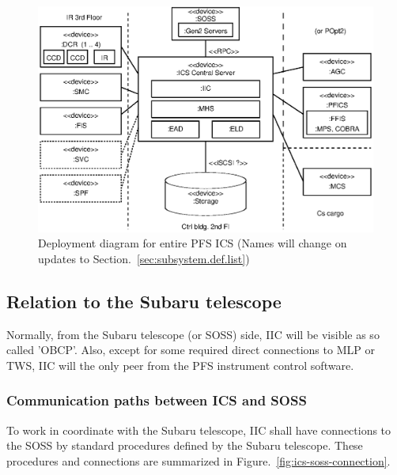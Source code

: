 \documentclass[a4paper,notitlepage]{article}
\begin{document}
\begin{figure}[htb]
  \begin{center}
    \includegraphics[scale=0.75]{deploy-diagram.eps}
  \end{center}
  \caption{Deployment diagram for entire PFS ICS (Names will change on updates 
          to Section.~\ref{sec:subsystem.def.list})}
  \label{fig:deploy-diagram}
\end{figure}



\subsection{Relation to the Subaru telescope}

Normally, from the Subaru telescope (or SOSS) side, IIC will be visible 
as so called 'OBCP'. Also, except for some required direct connections to MLP 
or TWS, IIC will the only peer from the PFS instrument control software. 

\subsubsection{Communication paths between ICS and SOSS}

To work in coordinate with the Subaru telescope, IIC shall have connections 
to the SOSS by standard procedures defined by the Subaru telescope. 
These procedures and connections are summarized in 
Figure.~\ref{fig:ics-soss-connection}. 
\end{document}
